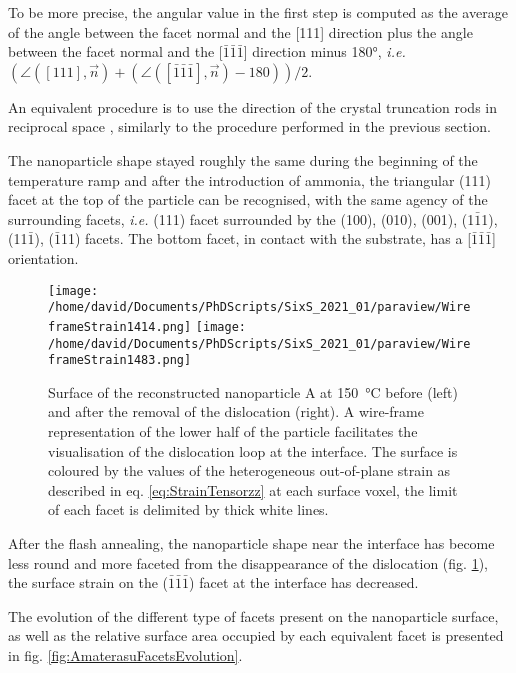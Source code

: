 To be more precise, the angular value in the first step is computed as the average of the angle between the facet normal and the [111] direction plus the angle between the facet normal and the [$\bar{1}\bar{1}\bar{1}$] direction minus \ang{180}, \textit{i.e.} $(\angle ([111], \vec{n}) + (\angle ([\bar{1}\bar{1}\bar{1}], \vec{n}) -180))/2$.

An equivalent procedure is to use the direction of the crystal truncation rods in reciprocal space \parencite{Richard2018}, similarly to the procedure performed in the previous section.

The nanoparticle shape stayed roughly the same during the beginning of the temperature ramp and after the introduction of ammonia, the triangular (111) facet at the top of the particle can be recognised, with the same agency of the surrounding facets, \textit{i.e.} (111) facet surrounded by the (100), (010), (001), (1$\bar{1}$1), (11$\bar{1}$), ($\bar{1}$11) facets.
The bottom facet, in contact with the substrate, has a [$\bar{1}\bar{1}\bar{1}$] orientation.

\begin{figure}[!htb]
    \centering
    \texttt{[image: /home/david/Documents/PhDScripts/SixS\_2021\_01/paraview/WireframeStrain1414.png]}
    \texttt{[image: /home/david/Documents/PhDScripts/SixS\_2021\_01/paraview/WireframeStrain1483.png]}
    \caption{
        Surface of the reconstructed nanoparticle A at \qty{150}{\degreeCelsius} before (left) and after the removal of the dislocation (right).
        A wire-frame representation of the lower half of the particle facilitates the visualisation of the dislocation loop at the interface.
        The surface is coloured by the values of the heterogeneous out-of-plane strain as described in eq. \ref{eq:StrainTensorzz} at each surface voxel, the limit of each facet is delimited by thick white lines.
    }
    \label{fig:AmaterasuDislocation}
\end{figure}

After the flash annealing, the nanoparticle shape near the interface has become less round and more faceted from the disappearance of the dislocation (fig. \ref{fig:AmaterasuDislocation}), the surface strain on the ($\bar{1}\bar{1}\bar{1}$) facet at the interface has decreased.

The evolution of the different type of facets present on the nanoparticle surface, as well as the relative surface area occupied by each equivalent facet is presented in fig. \ref{fig:AmaterasuFacetsEvolution}.

